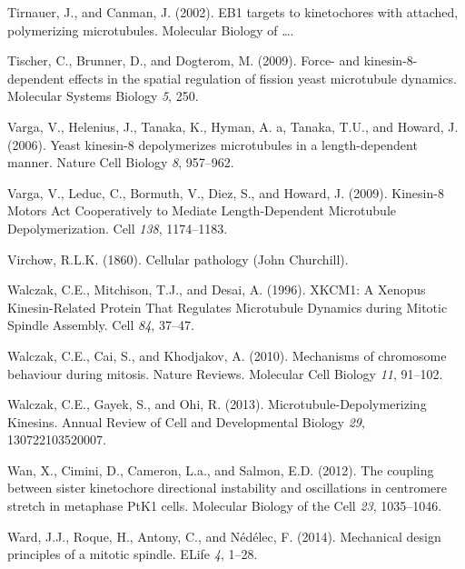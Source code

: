 \documentclass[12pt,a4paper,twoside,openright]{book}
\begin{document}
Tirnauer, J., and Canman, J. (2002). EB1 targets to kinetochores with
attached, polymerizing microtubules. Molecular Biology of \ldots{}.

Tischer, C., Brunner, D., and Dogterom, M. (2009). Force- and
kinesin-8-dependent effects in the spatial regulation of fission yeast
microtubule dynamics. Molecular Systems Biology \emph{5}, 250.

Varga, V., Helenius, J., Tanaka, K., Hyman, A. a, Tanaka, T.U., and
Howard, J. (2006). Yeast kinesin-8 depolymerizes microtubules in a
length-dependent manner. Nature Cell Biology \emph{8}, 957--962.

Varga, V., Leduc, C., Bormuth, V., Diez, S., and Howard, J. (2009).
Kinesin-8 Motors Act Cooperatively to Mediate Length-Dependent
Microtubule Depolymerization. Cell \emph{138}, 1174--1183.

Virchow, R.L.K. (1860). Cellular pathology (John Churchill).

Walczak, C.E., Mitchison, T.J., and Desai, A. (1996). XKCM1: A Xenopus
Kinesin-Related Protein That Regulates Microtubule Dynamics during
Mitotic Spindle Assembly. Cell \emph{84}, 37--47.

Walczak, C.E., Cai, S., and Khodjakov, A. (2010). Mechanisms of
chromosome behaviour during mitosis. Nature Reviews. Molecular Cell
Biology \emph{11}, 91--102.

Walczak, C.E., Gayek, S., and Ohi, R. (2013). Microtubule-Depolymerizing
Kinesins. Annual Review of Cell and Developmental Biology \emph{29},
130722103520007.

Wan, X., Cimini, D., Cameron, L.a., and Salmon, E.D. (2012). The
coupling between sister kinetochore directional instability and
oscillations in centromere stretch in metaphase PtK1 cells. Molecular
Biology of the Cell \emph{23}, 1035--1046.

Ward, J.J., Roque, H., Antony, C., and Nédélec, F. (2014). Mechanical
design principles of a mitotic spindle. ELife \emph{4}, 1--28.
\end{document}
